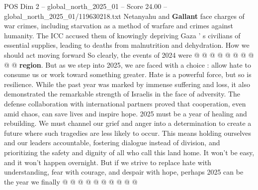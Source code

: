\begin{textsample}{POS Dim 2 – global\_north\_2025\_01 – Score 24.00 – global\_north\_2025\_01/119630218.txt}
Netanyahu and \textbf{Gallant} face charges of war crimes, including starvation as a method of warfare and crimes against humanity.
The ICC accused them of knowingly depriving Gaza ' s civilians of essential supplies, leading to deaths from malnutrition and dehydration.
How we should act moving forward So clearly, the events of 2024 were @ @ @ @ @ @ @ @ @ @ \textbf{region}.
But as we step into 2025, we are faced with a choice : allow hate to consume us or work toward something greater.
Hate is a powerful force, but so is resilience.
While the past year was marked by immense suffering and loss, it also demonstrated the remarkable strength of Israelis in the face of adversity.
The defense collaboration with international partners proved that cooperation, even amid chaos, can save lives and inspire hope. 2025 must be a year of healing and rebuilding.
We must channel our grief and anger into a determination to create a future where such tragedies are less likely to occur.
This means holding ourselves and our leaders accountable, fostering dialogue instead of division, and prioritizing the safety and dignity of all who call this land home.
It won't be easy, and it won't happen overnight.
But if we strive to replace hate with understanding, fear with courage, and despair with hope, perhaps 2025 can be the year we finally @ @ @ @ @ @ @ @ @ @

\end{textsample}
